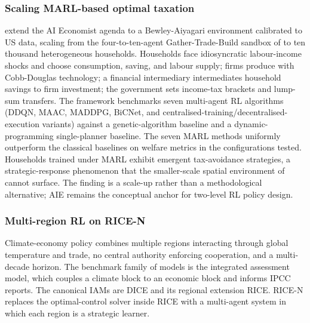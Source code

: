 \subsubsection{Scaling MARL-based optimal taxation}
\label{sec:macro:taxai}

\citet{Mi2024taxai} extend the AI Economist agenda to a Bewley-Aiyagari
environment calibrated to US data, scaling from the four-to-ten-agent
Gather-Trade-Build sandbox of \citet{Zheng2022aie} to ten thousand
heterogeneous households. Households face idiosyncratic labour-income
shocks and choose consumption, saving, and labour supply; firms
produce with Cobb-Douglas technology; a financial intermediary
intermediates household savings to firm investment; the government
sets income-tax brackets and lump-sum transfers. The framework
benchmarks seven multi-agent RL algorithms (DDQN, MAAC, MADDPG,
BiCNet, and centralised-training/decentralised-execution variants)
against a genetic-algorithm baseline and a dynamic-programming
single-planner baseline. The seven MARL methods uniformly outperform
the classical baselines on welfare metrics in the configurations
tested. Households trained under MARL exhibit emergent tax-avoidance
strategies, a strategic-response phenomenon that the smaller-scale
spatial environment of \citet{Zheng2022aie} cannot surface. The
finding is a scale-up rather than a methodological alternative; AIE
remains the conceptual anchor for two-level RL policy design.

\subsubsection{Multi-region RL on RICE-N}
\label{sec:macro:ricen}

Climate-economy policy combines multiple regions interacting through
global temperature and trade, no central authority enforcing
cooperation, and a multi-decade horizon. The benchmark family of
models is the integrated assessment model, which couples a climate
block to an economic block and informs IPCC reports. The canonical
IAMs are DICE \citep{Nordhaus1992dice} and its regional extension
RICE. RICE-N replaces the optimal-control solver inside RICE with a
multi-agent system in which each region is a strategic learner.

